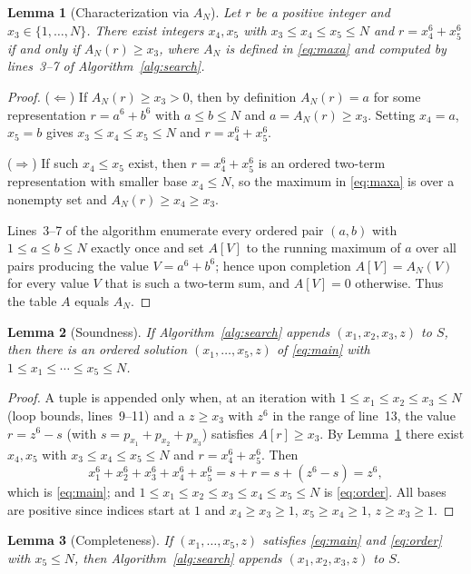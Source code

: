 \documentclass{amsart}
\newtheorem{lemma}{Lemma}
\begin{document}
\begin{lemma}[Characterization via $A_N$]\label{lem:Achar}
Let $r$ be a positive integer and $x_3\in\{1,\dots,N\}$. There exist
integers $x_4,x_5$ with $x_3\le x_4\le x_5\le N$ and $r=x_4^6+x_5^6$
if and only if $A_N(r)\ge x_3$, where $A_N$ is defined in
\eqref{eq:maxa} and computed by lines~3--7 of
Algorithm~\ref{alg:search}.
\end{lemma}

\begin{proof}
($\Leftarrow$) If $A_N(r)\ge x_3>0$, then by definition $A_N(r)=a$ for
some representation $r=a^6+b^6$ with $a\le b\le N$ and $a=A_N(r)\ge
x_3$. Setting $x_4=a$, $x_5=b$ gives $x_3\le x_4\le x_5\le N$ and
$r=x_4^6+x_5^6$.

($\Rightarrow$) If such $x_4\le x_5$ exist, then $r=x_4^6+x_5^6$ is an
ordered two-term representation with smaller base $x_4\le N$, so the
maximum in \eqref{eq:maxa} is over a nonempty set and
$A_N(r)\ge x_4\ge x_3$.

Lines~3--7 of the algorithm enumerate every ordered pair $(a,b)$ with
$1\le a\le b\le N$ exactly once and set $A[V]$ to the running maximum of
$a$ over all pairs producing the value $V=a^6+b^6$; hence upon
completion $A[V]=A_N(V)$ for every value $V$ that is such a two-term
sum, and $A[V]=0$ otherwise. Thus the table $A$ equals $A_N$.
\end{proof}

\begin{lemma}[Soundness]\label{lem:sound}
If Algorithm~\ref{alg:search} appends $(x_1,x_2,x_3,z)$ to $S$, then
there is an ordered solution $(x_1,\dots,x_5,z)$ of \eqref{eq:main}
with $1\le x_1\le\cdots\le x_5\le N$.
\end{lemma}

\begin{proof}
A tuple is appended only when, at an iteration with $1\le x_1\le x_2\le
x_3\le N$ (loop bounds, lines~9--11) and a $z\ge x_3$ with $z^6$ in the
range of line~13, the value $r=z^6-s$ (with $s=p_{x_1}+p_{x_2}+p_{x_3}$)
satisfies $A[r]\ge x_3$. By Lemma~\ref{lem:Achar} there exist
$x_4,x_5$ with $x_3\le x_4\le x_5\le N$ and $r=x_4^6+x_5^6$. Then
$$
x_1^6+x_2^6+x_3^6+x_4^6+x_5^6=s+r=s+(z^6-s)=z^6,
$$
which is \eqref{eq:main}; and $1\le x_1\le x_2\le x_3\le x_4\le x_5\le
N$ is \eqref{eq:order}. All bases are positive since indices start at
$1$ and $x_4\ge x_3\ge1$, $x_5\ge x_4\ge1$, $z\ge x_3\ge1$.
\end{proof}

\begin{lemma}[Completeness]\label{lem:complete}
If $(x_1,\dots,x_5,z)$ satisfies \eqref{eq:main} and \eqref{eq:order}
with $x_5\le N$, then Algorithm~\ref{alg:search} appends
$(x_1,x_2,x_3,z)$ to $S$.
\end{lemma}
\end{document}
